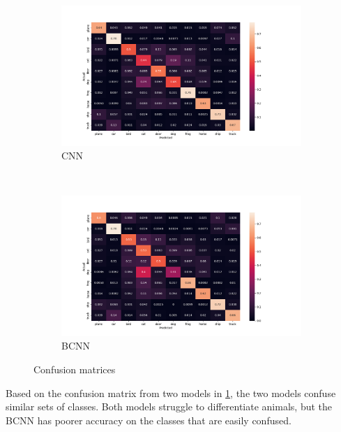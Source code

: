 \documentclass[12pt]{article}
\begin{document}
\begin{figure}[H]
	\centering
	\begin{subfigure}{\textwidth}
		\centering
		\includegraphics[width=.9\linewidth]{../Images/CNN_confusion_matrix}
		\caption{CNN}
	\end{subfigure} \\%
	\begin{subfigure}{\textwidth}
		\centering
		\includegraphics[width=.9\linewidth]{../Images/BNN_confusion_matrix}
		\caption{BCNN}
	\end{subfigure}
	\caption{Confusion matrices}
	\label{fig:confusion}
\end{figure}

Based on the confusion matrix from two models in \ref{fig:confusion}, the two models confuse similar sets of classes. Both models struggle to differentiate animals, but the BCNN has poorer accuracy on the classes that are easily confused. 

\newpage

\printbibliography
\end{document}
